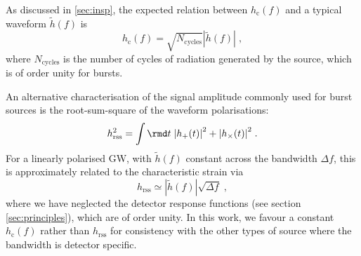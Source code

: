 As discussed in \ref{sec:insp}, the expected relation between $h_\mathrm{c}(f)$ and a typical waveform $\tilde{h}(f)$ is
\begin{equation}\label{eq:simple} 
h_\mathrm{c}(f) = \sqrt{{N}_{\mathrm{cycles}}}\left|\tilde{h}(f)\right| \; , 
\end{equation}
where ${N}_{\mathrm{cycles}}$ is the number of cycles of radiation generated by the source, which is of order unity for bursts. 

An alternative characterisation of the signal amplitude commonly used for burst sources is the root-sum-square of the waveform polarisations:
\begin{equation}
h_\mathrm{rss}^2 = \int \rmd t \; {|h_+(t)|}^2 + {|h_\times(t)|}^2 \; .
\end{equation}
For a linearly polarised GW, with $\tilde{h}(f)$ constant across the bandwidth $\Delta f$, this is approximately related to the characteristic strain via 
\begin{equation}
h_\mathrm{rss} \simeq \left|\tilde{h}(f)\right|\sqrt{\Delta f}\;,\label{eq:rela}
\end{equation}
where we have neglected the detector response functions (see section \ref{sec:principles}), which are of order unity. In this work, we favour a constant $h_\mathrm{c}(f)$ rather than $h_\mathrm{rss}$ for consistency with the other types of source where the bandwidth is detector specific.

